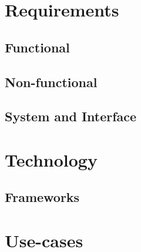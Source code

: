 \section{Requirements}

	\subsection{Functional}

	\subsection{Non-functional}
	
	\subsection{System and Interface}
	
\section{Technology}

	\subsection{Frameworks}
	
\section{Use-cases}